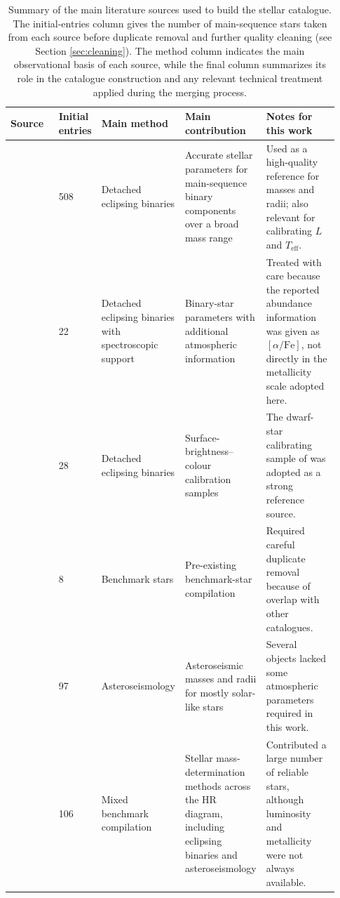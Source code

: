 \begin{table}[H]
\centering
\caption{Summary of the main literature sources used to build the stellar catalogue. The initial-entries column gives the number of main-sequence stars taken from each source before duplicate removal and further quality cleaning (see Section \ref{sec:cleaning}). The method column indicates the main observational basis of each source, while the final column summarizes its role in the catalogue construction and any relevant technical treatment applied during the merging process.}
\label{tab:catalogue_sources}
\scriptsize
\setlength{\tabcolsep}{3pt}
\renewcommand{\arraystretch}{1.12}
\begin{tabular}{p{0.17\linewidth}p{0.09\linewidth}p{0.18\linewidth}p{0.22\linewidth}p{0.27\linewidth}}
\hline\hline
Source & Initial entries & Main method & Main contribution & Notes for this work \\
\hline
\citet{Eker2018} & 508 & Detached eclipsing binaries & Accurate stellar parameters for main-sequence binary components over a broad mass range & Used as a high-quality reference for masses and radii; also relevant for calibrating $L$ and $T_{\mathrm{eff}}$. \\
\hline
\citet{Helminiak2019} & 22 & Detached eclipsing binaries with spectroscopic support & Binary-star parameters with additional atmospheric information & Treated with care because the reported abundance information was given as $[\alpha/\mathrm{Fe}]$, not directly in the metallicity scale adopted here. \\
\hline
\citet{Graczyk2021,Graczyk2022} & 28 & Detached eclipsing binaries & Surface-brightness--colour calibration samples & The dwarf-star calibrating sample of \citet{Graczyk2022} was adopted as a strong reference source. \\
\hline
\citet{Nsamba2025} & 8 & Benchmark stars & Pre-existing benchmark-star compilation & Required careful duplicate removal because of overlap with other catalogues. \\
\hline
\citet{Bellinger2019} & 97 & Asteroseismology & Asteroseismic masses and radii for mostly solar-like stars & Several objects lacked some atmospheric parameters required in this work. \\
\hline
\citet{Serenelli2021} & 106 & Mixed benchmark compilation & Stellar mass-determination methods across the HR diagram, including eclipsing binaries and asteroseismology & Contributed a large number of reliable stars, although luminosity and metallicity were not always available. \\

\end{tabular}
\end{table}
